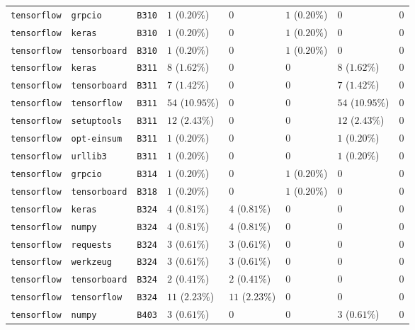 \begin{table}
\begin{tabular}{llllllll}
\texttt{tensorflow} & \texttt{grpcio} & \texttt{B310} & $1$ ($0.20\%$) & $0$ & $1$ ($0.20\%$) & $0$ & $0$ \\
\texttt{tensorflow} & \texttt{keras} & \texttt{B310} & $1$ ($0.20\%$) & $0$ & $1$ ($0.20\%$) & $0$ & $0$ \\
\texttt{tensorflow} & \texttt{tensorboard} & \texttt{B310} & $1$ ($0.20\%$) & $0$ & $1$ ($0.20\%$) & $0$ & $0$ \\
\texttt{tensorflow} & \texttt{keras} & \texttt{B311} & $8$ ($1.62\%$) & $0$ & $0$ & $8$ ($1.62\%$) & $0$ \\
\texttt{tensorflow} & \texttt{tensorboard} & \texttt{B311} & $7$ ($1.42\%$) & $0$ & $0$ & $7$ ($1.42\%$) & $0$ \\
\texttt{tensorflow} & \texttt{tensorflow} & \texttt{B311} & $54$ ($10.95\%$) & $0$ & $0$ & $54$ ($10.95\%$) & $0$ \\
\texttt{tensorflow} & \texttt{setuptools} & \texttt{B311} & $12$ ($2.43\%$) & $0$ & $0$ & $12$ ($2.43\%$) & $0$ \\
\texttt{tensorflow} & \texttt{opt-einsum} & \texttt{B311} & $1$ ($0.20\%$) & $0$ & $0$ & $1$ ($0.20\%$) & $0$ \\
\texttt{tensorflow} & \texttt{urllib3} & \texttt{B311} & $1$ ($0.20\%$) & $0$ & $0$ & $1$ ($0.20\%$) & $0$ \\
\texttt{tensorflow} & \texttt{grpcio} & \texttt{B314} & $1$ ($0.20\%$) & $0$ & $1$ ($0.20\%$) & $0$ & $0$ \\
\texttt{tensorflow} & \texttt{tensorboard} & \texttt{B318} & $1$ ($0.20\%$) & $0$ & $1$ ($0.20\%$) & $0$ & $0$ \\
\texttt{tensorflow} & \texttt{keras} & \texttt{B324} & $4$ ($0.81\%$) & $4$ ($0.81\%$) & $0$ & $0$ & $0$ \\
\texttt{tensorflow} & \texttt{numpy} & \texttt{B324} & $4$ ($0.81\%$) & $4$ ($0.81\%$) & $0$ & $0$ & $0$ \\
\texttt{tensorflow} & \texttt{requests} & \texttt{B324} & $3$ ($0.61\%$) & $3$ ($0.61\%$) & $0$ & $0$ & $0$ \\
\texttt{tensorflow} & \texttt{werkzeug} & \texttt{B324} & $3$ ($0.61\%$) & $3$ ($0.61\%$) & $0$ & $0$ & $0$ \\
\texttt{tensorflow} & \texttt{tensorboard} & \texttt{B324} & $2$ ($0.41\%$) & $2$ ($0.41\%$) & $0$ & $0$ & $0$ \\
\texttt{tensorflow} & \texttt{tensorflow} & \texttt{B324} & $11$ ($2.23\%$) & $11$ ($2.23\%$) & $0$ & $0$ & $0$ \\
\texttt{tensorflow} & \texttt{numpy} & \texttt{B403} & $3$ ($0.61\%$) & $0$ & $0$ & $3$ ($0.61\%$) & $0$ \\

\end{tabular}
\end{table}
